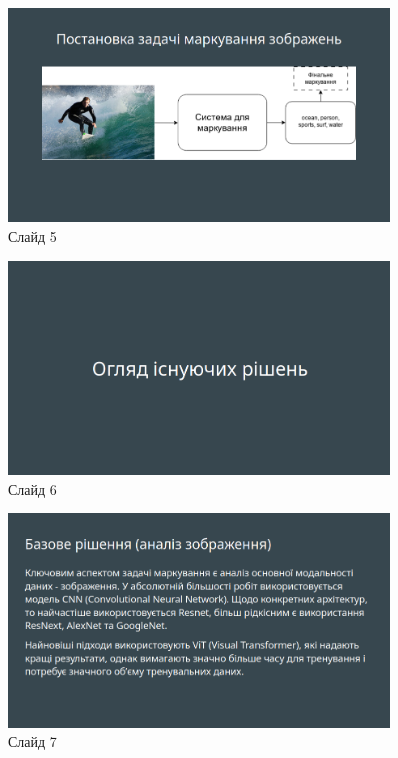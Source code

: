 \documentclass{udstu}
\begin{document}
\begin{figure}[!ht]
	\centering
	\includegraphics[width=0.9\textwidth]{PNG/present/present-5}
	\caption{Слайд 5}
\end{figure}

\begin{figure}[!ht]
	\centering
	\includegraphics[width=0.9\textwidth]{PNG/present/present-6}
	\caption{Слайд 6}
\end{figure}

\begin{figure}[!ht]
	\centering
	\includegraphics[width=0.9\textwidth]{PNG/present/present-7}
	\caption{Слайд 7}
\end{figure}
\end{document}
